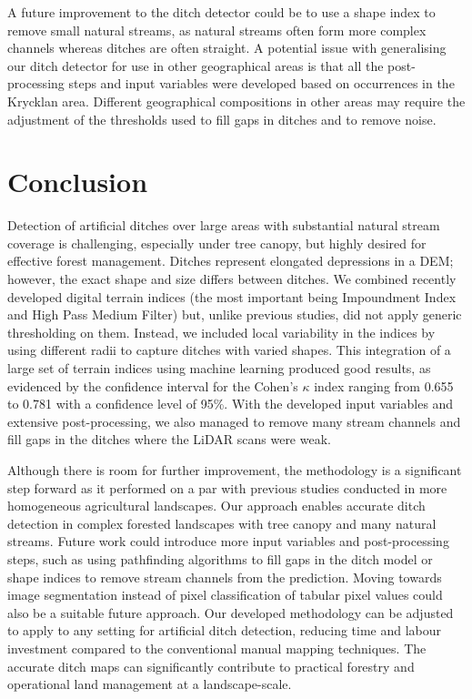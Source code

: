 \documentclass[]{interact}
\theoremstyle{plain}%
\theoremstyle{definition}
\theoremstyle{remark}
\begin{document}
A future improvement to the ditch detector could be to use a shape index to remove small natural streams, as natural streams often form more complex channels whereas ditches are often straight. A potential issue with generalising our ditch detector for use in other geographical areas is that all the post-processing steps and input variables were developed based on occurrences in the Krycklan area. Different geographical compositions in other areas may require the adjustment of the thresholds used to fill gaps in ditches and to remove noise.

\section{Conclusion}

Detection of artificial ditches over large areas with substantial natural stream coverage is challenging, especially under tree canopy, but highly desired for effective forest management. Ditches represent elongated depressions in a DEM; however, the exact shape and size differs between ditches. We combined recently developed digital terrain indices (the most important being Impoundment Index and High Pass Medium Filter) but, unlike previous studies, did not apply generic thresholding on them. Instead, we included local variability in the indices by using different radii to capture ditches with varied shapes. This integration of a large set of terrain indices using machine learning produced good results, as evidenced by the confidence interval for the Cohen's $\kappa$ index ranging from 0.655 to 0.781 with a confidence level of 95\%. With the developed input variables and extensive post-processing, we also managed to remove many stream channels and fill gaps in the ditches where the LiDAR scans were weak. 

Although there is room for further improvement, the methodology is a significant step forward as it performed on a par with previous studies conducted in more homogeneous agricultural landscapes. Our approach enables accurate ditch detection in complex forested landscapes with tree canopy and many natural streams. Future work could introduce more input variables and post-processing steps, such as using pathfinding algorithms to fill gaps in the ditch model or shape indices to remove stream channels from the prediction. Moving towards image segmentation instead of pixel classification of tabular pixel values could also be a suitable future approach. Our developed methodology can be adjusted to apply to any setting for artificial ditch detection, reducing time and labour investment compared to the conventional manual mapping techniques. The accurate ditch maps can significantly contribute to practical forestry and operational land management at a landscape-scale.
\end{document}
